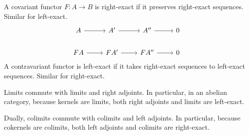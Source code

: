 \begin{definition}
A covariant functor $F:A\rightarrow B$ is right-exact if it preserves right-exact sequences. Similar for left-exact.
\[\begin{tikzcd}
A \arrow[r]  & A' \arrow[r]  & A'' \arrow[r]  & 0 \\
FA \arrow[r] & FA' \arrow[r] & FA'' \arrow[r] & 0
\end{tikzcd}\]
A contravariant functor is left-exact if it takes right-exact sequences to left-exact sequences. Similar for right-exact.
\end{definition}

\begin{lemma}
Limits commute with limits and right adjoints. In particular, in an abelian category,
because kernels are limits, both right adjoints and limits are left-exact.

Dually, colimits commute with colimits and left adjoints. In particular, because cokernels are
colimits, both left adjoints and colimits are right-exact.
\end{lemma}